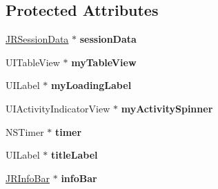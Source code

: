 \subsection*{Protected Attributes}
\begin{DoxyCompactItemize}
\item 
\hypertarget{interface_j_r_providers_controller_a47805561913e116e9fe21b60243304a2}{
\hyperlink{interface_j_r_session_data}{JRSessionData} $\ast$ {\bfseries sessionData}}
\label{interface_j_r_providers_controller_a47805561913e116e9fe21b60243304a2}

\item 
\hypertarget{interface_j_r_providers_controller_a766738ebb198539849c1797309495ed9}{
UITableView $\ast$ {\bfseries myTableView}}
\label{interface_j_r_providers_controller_a766738ebb198539849c1797309495ed9}

\item 
\hypertarget{interface_j_r_providers_controller_af2aab83b19d07dca40a4b3413ca1ea0a}{
UILabel $\ast$ {\bfseries myLoadingLabel}}
\label{interface_j_r_providers_controller_af2aab83b19d07dca40a4b3413ca1ea0a}

\item 
\hypertarget{interface_j_r_providers_controller_af20bfd308696b1aa5d7c3d4381704202}{
UIActivityIndicatorView $\ast$ {\bfseries myActivitySpinner}}
\label{interface_j_r_providers_controller_af20bfd308696b1aa5d7c3d4381704202}

\item 
\hypertarget{interface_j_r_providers_controller_a32f41b2612f09a6cb68edc1e7c5123c1}{
NSTimer $\ast$ {\bfseries timer}}
\label{interface_j_r_providers_controller_a32f41b2612f09a6cb68edc1e7c5123c1}

\item 
\hypertarget{interface_j_r_providers_controller_ad5b90a35eeb34d12efaf66e8ef9b02fa}{
UILabel $\ast$ {\bfseries titleLabel}}
\label{interface_j_r_providers_controller_ad5b90a35eeb34d12efaf66e8ef9b02fa}

\item 
\hypertarget{interface_j_r_providers_controller_a8a337416e1e64cd30033dd8b351ada65}{
\hyperlink{interface_j_r_info_bar}{JRInfoBar} $\ast$ {\bfseries infoBar}}
\label{interface_j_r_providers_controller_a8a337416e1e64cd30033dd8b351ada65}

\end{DoxyCompactItemize}
